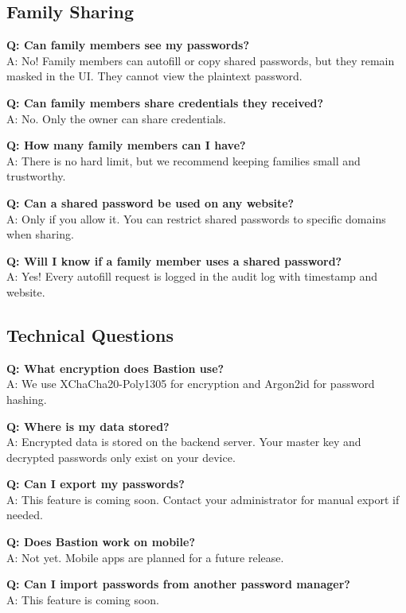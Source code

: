 \documentclass[11pt,a4paper]{article}
\begin{document}
\subsection{Family Sharing}
\textbf{Q: Can family members see my passwords?} \\
A: No! Family members can autofill or copy shared passwords, but they remain masked in the UI. They cannot view the plaintext password.

\textbf{Q: Can family members share credentials they received?} \\
A: No. Only the owner can share credentials.

\textbf{Q: How many family members can I have?} \\
A: There is no hard limit, but we recommend keeping families small and trustworthy.

\textbf{Q: Can a shared password be used on any website?} \\
A: Only if you allow it. You can restrict shared passwords to specific domains when sharing.

\textbf{Q: Will I know if a family member uses a shared password?} \\
A: Yes! Every autofill request is logged in the audit log with timestamp and website.

\subsection{Technical Questions}
\textbf{Q: What encryption does Bastion use?} \\
A: We use XChaCha20-Poly1305 for encryption and Argon2id for password hashing.

\textbf{Q: Where is my data stored?} \\
A: Encrypted data is stored on the backend server. Your master key and decrypted passwords only exist on your device.

\textbf{Q: Can I export my passwords?} \\
A: This feature is coming soon. Contact your administrator for manual export if needed.

\textbf{Q: Does Bastion work on mobile?} \\
A: Not yet. Mobile apps are planned for a future release.

\textbf{Q: Can I import passwords from another password manager?} \\
A: This feature is coming soon.
\end{document}

